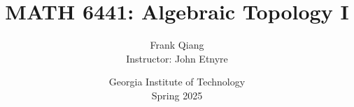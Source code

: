 \documentclass[12pt, letterpaper, oneside]{book}
\title{MATH 6441: Algebraic Topology I}
\author{Frank Qiang\\Instructor: John Etnyre}
\date{Georgia Institute of Technology\\Spring 2025}
\theoremstyle{definition}
\begin{document}
  \maketitle

  \begingroup
  \let\cleardoublepage\clearpage
  \tableofcontents
  \endgroup

  
  
  
  
  
  
  
  
  
  
  
  
  
  
  
  
  
  
  
  
  
  
  
\end{document}
